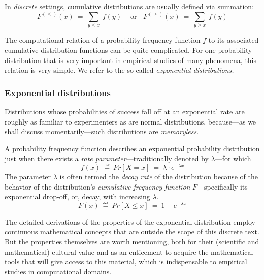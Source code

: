 In {\em discrete} settings, cumulative distributions are usually defined via summation:
\[ F^{(\leq)}(x) \ = \ \sum_{y \leq x} \ f(y)  \ \ \ \ \mbox{ or} \ \ \ \ F^{(\geq)}(x) \ = \ \sum_{y \geq x} \ f(y) \]

\bigskip

The computational relation of a probability frequency function $f$ to its associated cumulative distribution functions can be quite complicated.  For one probability distribution that is very important in empirical studies of many phenomena, this relation is very simple.  We refer to the so-called {\em exponential distributions.}



\subsubsection{Exponential distributions} 
\label{sec:exponential-distr}

Distributions whose probabilities of success fall off at an exponential rate are roughly as familiar to experimenters as are normal distributions, because---as we shall discuss momentarily---such distributions are {\em memoryless}.

\medskip

A probability frequency function describes an exponential probability distribution just when there exists a {\em rate parameter}---traditionally denoted by $\lambda$---for which
\[ f(x) \ \eqdef \ Pr[X=x] \ = \ \lambda \cdot e^{-\lambda x} \]
The parameter $\lambda$ is often termed the {\em decay rate} of the distribution because of the behavior of the distribution's {\em cumulative frequency function} $F$---specifically its exponential drop-off, or, decay, with increasing $\lambda$.
\[ F(x) \ \eqdef \ Pr[X \leq x] \ = \ 1 - e^{-\lambda x} \]

 
 

\medskip

The detailed derivations of the properties of the exponential distribution employ continuous mathematical concepts that are outside the scope of this discrete text.  But the properties themselves are worth mentioning, both for their (scientific and mathematical) cultural value and as an enticement to acquire the mathematical tools that will give access to this material, which is indispensable to empirical studies in computational domains.

